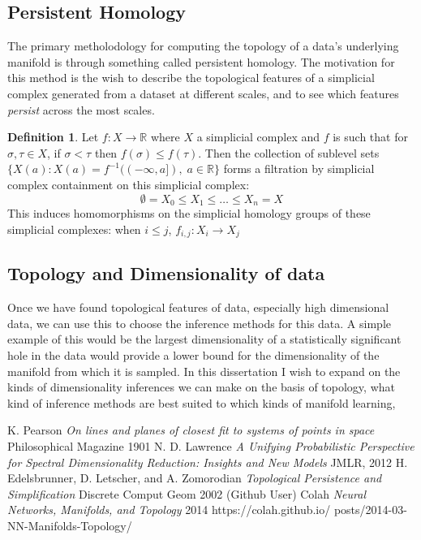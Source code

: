 \documentclass[a4paper,12pt]{report}
\theoremstyle{definition}
\newtheorem{definition}{Definition}[chapter]
\begin{document}
 
 
 \subsection*{Persistent Homology}
 The primary metholodology for computing the topology of a data's underlying manifold is through something called persistent homology. The motivation for this method is the wish to describe the topological features of a simplicial complex generated from a dataset at different scales, and to see which features {\em persist} across the most scales.
 
 \begin{definition}
 Let $f:X \rightarrow \mathbb{R}$ where $X$ a simplicial complex and $f$ is such that for $\sigma, \tau \in X$, if $\sigma < \tau$ then $f(\sigma)\leq f(\tau)$. Then the collection of sublevel sets $\{X(a): X(a) = f^{-1}((-\infty,a]), \; a \in \mathbb{R}\}$ forms a filtration by simplicial complex containment on this simplicial complex: $$\emptyset = X_0 \leq X_1 \leq \dots \leq X_n = X$$
 This induces homomorphisms on the simplicial homology groups of these simplicial complexes: when $i\leq j$,  $f_{i,j}: X_i\rightarrow X_j$
 \end{definition}
 \subsection*{Topology and Dimensionality of data}
 Once we have found topological features of data, especially high dimensional data, we can use this to choose the inference methods for this data. A simple example of this would be the largest dimensionality of a statistically significant hole in the data would provide a lower bound for the dimensionality of the manifold from which it is sampled. In this dissertation I wish to expand on the kinds of dimensionality inferences we can make on the basis of topology, what kind of inference methods are best suited to which kinds of manifold learning, 
 
 \begin{thebibliography}{}
  K. Pearson {\em On lines and planes of closest fit to systems of points in space} Philosophical Magazine 1901
  N. D. Lawrence {\em A Unifying Probabilistic Perspective for Spectral Dimensionality Reduction: Insights and New Models} JMLR, 2012
 \bibitem{} H. Edelsbrunner, D. Letscher, and A. Zomorodian {\em Topological Persistence and Simplification} Discrete Comput Geom 2002
  (Github User) Colah {\em Neural Networks, Manifolds, and Topology} 2014 https://colah.github.io/ posts/2014-03-NN-Manifolds-Topology/
 \bibitem{}
 \end{thebibliography}
\end{document}
